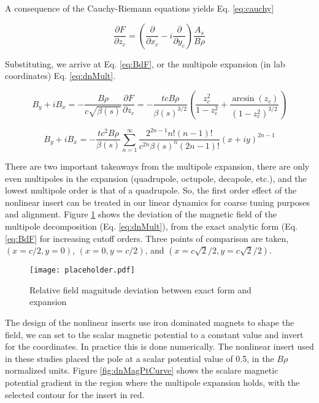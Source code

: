 A consequence of the Cauchy-Riemann equations yields Eq. \ref{eq:cauchy}

\begin{equation} \label{eq:cauchy}
	\frac{\partial F}{\partial z_c} = \left(\frac{\partial }{\partial x_c} - i\frac{\partial }{\partial y_c}\right) \frac{A_s}{B\rho}
\end{equation}

Substituting, we arrive at Eq. \ref{eq:BdF}, or the multipole expansion (in lab coordinates) Eq. \ref{eq:dnMult}.

\begin{equation} \label{eq:BdF}
	B_y + i B_x  = -\frac{B\rho}{c\sqrt{\beta(s)}}\frac{\partial F}{\partial z_c} = - \frac{t c B\rho}{\beta(s)^{3/2}} \left( \frac{z_c^2}{1 - z_c^2} + \frac{\arcsin{(z_c)}}{\left(1-z_c^2\right)^{3/2}}\right)
\end{equation}

\begin{equation} \label{eq:dnMult}
	B_y + i B_x = - \frac{t c^2 B\rho}{\beta(s)} \sum_{n=1}^{\infty} \frac{2^{2n-1}n!(n-1)!}{c^{2n}\beta(s)^n(2n-1)!} (x + i y)^{2n -1}
\end{equation}

There are two important takeaways from the multipole expansion, there are only even multipoles in the expansion (quadrupole, octupole, decapole, etc.), and the lowest multipole order is that of a quadrupole. So, the first order effect of the nonlinear insert can be treated in our linear dynamics for coarse tuning purposes and alignment. Figure \ref{fig:dnMultRatio} shows the deviation of the magnetic field of the multipole decomposition (Eq. \ref{eq:dnMult}), from the exact analytic form (Eq. \ref{eq:BdF} for increasing cutoff orders. Three points of comparison are taken, $(x=c/2,y=0)$, $(x=0,y=c/2)$, and $(x=c\sqrt{2}/2,y=c\sqrt{2}/2)$. 

\begin{figure}
	\centering
	\texttt{[image: placeholder.pdf]}
	\caption{Relative field magnitude deviation between exact form and expansion}
	\label{fig:dnMultRatio}
\end{figure}

The design of the nonlinear inserts use iron dominated magnets to shape the field, we can set to the scalar magnetic potential to a constant value and invert for the coordinates. In practice this is done numerically. The nonlinear insert used in these studies placed the pole at a scalar potential value of 0.5, in the $B\rho$ normalized units. Figure \ref{fig:dnMagPtCurve} shows the scalare magnetic potential gradient in the region where the multipole expansion holds, with the selected contour for the insert in red.


